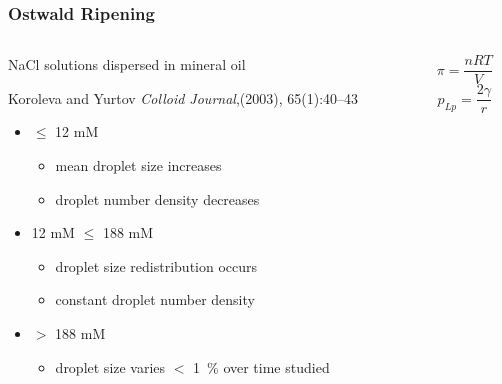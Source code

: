 \documentclass[10pt]{beamer}
\begin{document}
\begin{frame}
\frametitle{Ostwald Ripening}
\begin{columns}
\begin{column}{0.5\textwidth}
\begin{block}{NaCl solutions dispersed in mineral oil}

Koroleva and Yurtov {\em Colloid Journal},(2003), 65(1):40--43
\end{block}

\vspace{2 mm}
\begin{itemize}
\item $\leq$ 12 mM
\begin{itemize}
\item mean droplet size increases
\item droplet number density decreases
\end{itemize}
\item 12 mM $\leq$ 188 mM
\begin{itemize}
\item droplet size redistribution occurs
\item constant droplet number density
\end{itemize}
\item $>$ 188 mM
\begin{itemize}
\item droplet size varies $<$ 1~\% over time studied
\end{itemize}
\end{itemize}


\end{column}

\begin{column}{0.45\textwidth}
\vspace{5mm}
\[\pi = \frac{nRT}{V} \]
\[p_{Lp} = \frac{2\gamma}{r}\]
\end{column}
\end{columns}
\end{frame}
\end{document}

